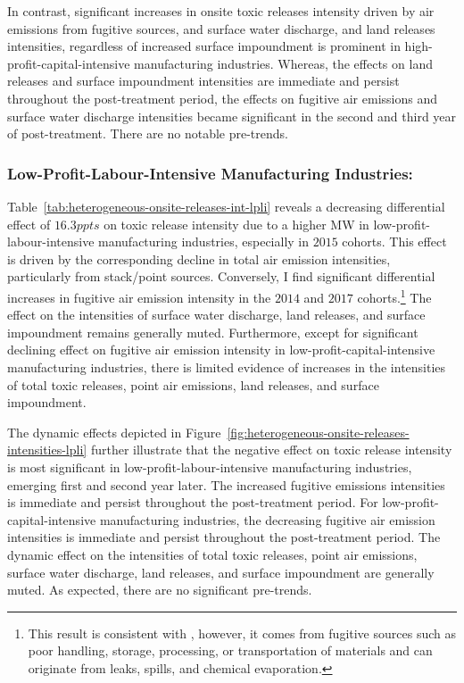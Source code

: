 \documentclass[authoryear, preprint, twocolumn, 1p]{elsarticle}
\begin{document}
    In contrast, significant increases in onsite toxic releases intensity driven by air emissions from fugitive sources, and surface water discharge, and land releases intensities, regardless of increased surface impoundment is prominent in high-profit-capital-intensive manufacturing industries. Whereas, the effects on land releases and surface impoundment intensities are immediate and persist throughout the post-treatment period, the effects on fugitive air emissions and surface water discharge intensities became significant in the second and third year of post-treatment. There are no notable pre-trends.

    \subsubsection{Low-Profit-Labour-Intensive Manufacturing Industries:}
    Table~\ref{tab:heterogeneous-onsite-releases-int-lpli} reveals a decreasing differential effect of $16.3ppts$ on toxic release intensity due to a higher MW in low-profit-labour-intensive manufacturing industries, especially in $2015$ cohorts. This effect is driven by the corresponding decline in total air emission intensities, particularly from stack/point sources. Conversely, I find significant differential increases in fugitive air emission intensity in the $2014$ and $2017$ cohorts.\footnote{\tiny This result is consistent with \citet{zhang2023unintended}, however, it comes from fugitive sources such as poor handling, storage, processing, or transportation of materials and can originate from leaks, spills, and chemical evaporation.} The effect on the intensities of surface water discharge, land releases, and surface impoundment remains generally muted. Furthermore, except for significant declining effect on fugitive air emission intensity in low-profit-capital-intensive manufacturing industries, there is limited evidence of increases in the intensities of total toxic releases, point air emissions, land releases, and surface impoundment.
    

    The dynamic effects depicted in Figure~\ref{fig:heterogeneous-onsite-releases-intensities-lpli} further illustrate that the negative effect on toxic release intensity is most significant in low-profit-labour-intensive manufacturing industries, emerging first and second year later. The increased fugitive emissions intensities is immediate and persist throughout the post-treatment period. For low-profit-capital-intensive manufacturing industries, the decreasing fugitive air emission intensities is immediate and persist throughout the post-treatment period. The dynamic effect on the intensities of total toxic releases, point air emissions, surface water discharge, land releases, and surface impoundment are generally muted. As expected, there are no significant pre-trends.
    
\end{document}
